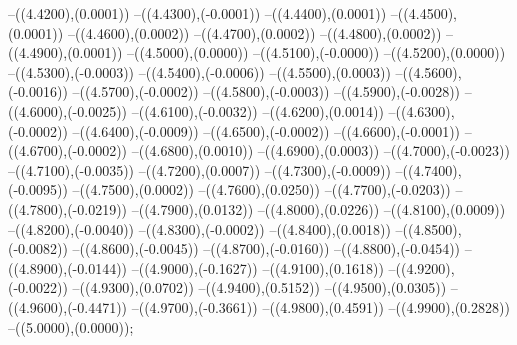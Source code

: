 {	--({\sx*(4.4200)},{\sy*(0.0001)})
	--({\sx*(4.4300)},{\sy*(-0.0001)})
	--({\sx*(4.4400)},{\sy*(0.0001)})
	--({\sx*(4.4500)},{\sy*(0.0001)})
	--({\sx*(4.4600)},{\sy*(0.0002)})
	--({\sx*(4.4700)},{\sy*(0.0002)})
	--({\sx*(4.4800)},{\sy*(0.0002)})
	--({\sx*(4.4900)},{\sy*(0.0001)})
	--({\sx*(4.5000)},{\sy*(0.0000)})
	--({\sx*(4.5100)},{\sy*(-0.0000)})
	--({\sx*(4.5200)},{\sy*(0.0000)})
	--({\sx*(4.5300)},{\sy*(-0.0003)})
	--({\sx*(4.5400)},{\sy*(-0.0006)})
	--({\sx*(4.5500)},{\sy*(0.0003)})
	--({\sx*(4.5600)},{\sy*(-0.0016)})
	--({\sx*(4.5700)},{\sy*(-0.0002)})
	--({\sx*(4.5800)},{\sy*(-0.0003)})
	--({\sx*(4.5900)},{\sy*(-0.0028)})
	--({\sx*(4.6000)},{\sy*(-0.0025)})
	--({\sx*(4.6100)},{\sy*(-0.0032)})
	--({\sx*(4.6200)},{\sy*(0.0014)})
	--({\sx*(4.6300)},{\sy*(-0.0002)})
	--({\sx*(4.6400)},{\sy*(-0.0009)})
	--({\sx*(4.6500)},{\sy*(-0.0002)})
	--({\sx*(4.6600)},{\sy*(-0.0001)})
	--({\sx*(4.6700)},{\sy*(-0.0002)})
	--({\sx*(4.6800)},{\sy*(0.0010)})
	--({\sx*(4.6900)},{\sy*(0.0003)})
	--({\sx*(4.7000)},{\sy*(-0.0023)})
	--({\sx*(4.7100)},{\sy*(-0.0035)})
	--({\sx*(4.7200)},{\sy*(0.0007)})
	--({\sx*(4.7300)},{\sy*(-0.0009)})
	--({\sx*(4.7400)},{\sy*(-0.0095)})
	--({\sx*(4.7500)},{\sy*(0.0002)})
	--({\sx*(4.7600)},{\sy*(0.0250)})
	--({\sx*(4.7700)},{\sy*(-0.0203)})
	--({\sx*(4.7800)},{\sy*(-0.0219)})
	--({\sx*(4.7900)},{\sy*(0.0132)})
	--({\sx*(4.8000)},{\sy*(0.0226)})
	--({\sx*(4.8100)},{\sy*(0.0009)})
	--({\sx*(4.8200)},{\sy*(-0.0040)})
	--({\sx*(4.8300)},{\sy*(-0.0002)})
	--({\sx*(4.8400)},{\sy*(0.0018)})
	--({\sx*(4.8500)},{\sy*(-0.0082)})
	--({\sx*(4.8600)},{\sy*(-0.0045)})
	--({\sx*(4.8700)},{\sy*(-0.0160)})
	--({\sx*(4.8800)},{\sy*(-0.0454)})
	--({\sx*(4.8900)},{\sy*(-0.0144)})
	--({\sx*(4.9000)},{\sy*(-0.1627)})
	--({\sx*(4.9100)},{\sy*(0.1618)})
	--({\sx*(4.9200)},{\sy*(-0.0022)})
	--({\sx*(4.9300)},{\sy*(0.0702)})
	--({\sx*(4.9400)},{\sy*(0.5152)})
	--({\sx*(4.9500)},{\sy*(0.0305)})
	--({\sx*(4.9600)},{\sy*(-0.4471)})
	--({\sx*(4.9700)},{\sy*(-0.3661)})
	--({\sx*(4.9800)},{\sy*(0.4591)})
	--({\sx*(4.9900)},{\sy*(0.2828)})
	--({\sx*(5.0000)},{\sy*(0.0000)});
}
